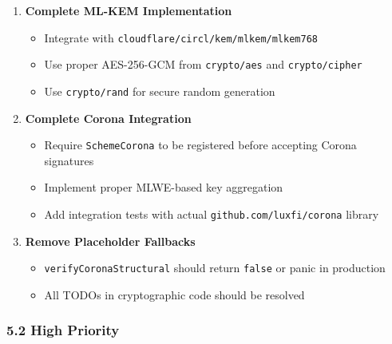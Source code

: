\documentclass[
]{article}
\providecommand{\tightlist}{%
  \setlength{\itemsep}{0pt}\setlength{\parskip}{0pt}}
\begin{document}
\begin{enumerate}
\def\labelenumi{\arabic{enumi}.}
\item
  \textbf{Complete ML-KEM Implementation}

  \begin{itemize}
  \tightlist
  \item
    Integrate with \texttt{cloudflare/circl/kem/mlkem/mlkem768}
  \item
    Use proper AES-256-GCM from \texttt{crypto/aes} and
    \texttt{crypto/cipher}
  \item
    Use \texttt{crypto/rand} for secure random generation
  \end{itemize}
\item
  \textbf{Complete Corona Integration}

  \begin{itemize}
  \tightlist
  \item
    Require \texttt{SchemeCorona} to be registered before accepting
    Corona signatures
  \item
    Implement proper MLWE-based key aggregation
  \item
    Add integration tests with actual \texttt{github.com/luxfi/corona}
    library
  \end{itemize}
\item
  \textbf{Remove Placeholder Fallbacks}

  \begin{itemize}
  \tightlist
  \item
    \texttt{verifyCoronaStructural} should return \texttt{false} or
    panic in production
  \item
    All TODOs in cryptographic code should be resolved
  \end{itemize}
\end{enumerate}

\subsubsection{5.2 High Priority}\label{52-high-priority}
\end{document}
